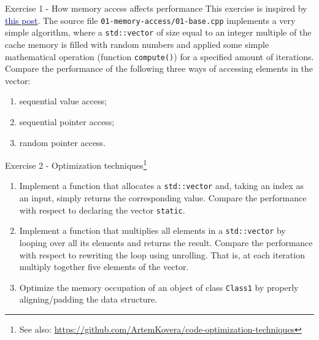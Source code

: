 \documentclass[10pt,aspectratio=169]{beamer}
\begin{document}
\begin{frame}{Exercise 1 - How memory access affects performance}
    This exercise is inspired by \href{https://bitbashing.io/memory-performance.html}{\textcolor{DarkBlue}{this post}}.
    \vfill
    The source file \texttt{01-memory-access/01-base.cpp} implements a very simple algorithm, where a \texttt{std::vector} of size equal to an integer multiple of the cache memory is filled with random numbers and applied some simple mathematical operation (function \texttt{compute()}) for a specified amount of iterations.
    \vfill
    Compare the performance of the following three ways of accessing elements in the vector:
    \begin{enumerate}
        \item sequential value access;
        \item sequential pointer access;
        \item random pointer access.
    \end{enumerate}
\end{frame}

\begin{frame}{Exercise 2 - Optimization techniques\footnote{See also: \url{https://github.com/ArtemKovera/code-optimization-techniques}}}
    \begin{enumerate}
        \item Implement a function that allocates a \texttt{std::vector} and, taking an index as an input, simply returns the corresponding value. Compare the performance with respect to declaring the vector \texttt{static}.
        \item Implement a function that multiplies all elements in a \texttt{std::vector} by looping over all its elements and returns the result. Compare the performance with respect to rewriting the loop using unrolling. That is, at each iteration multiply together five elements of the vector.
        \item Optimize the memory occupation of an object of class \texttt{Class1} by properly aligning/padding the data structure.
    \end{enumerate}
\end{frame}
\end{document}
